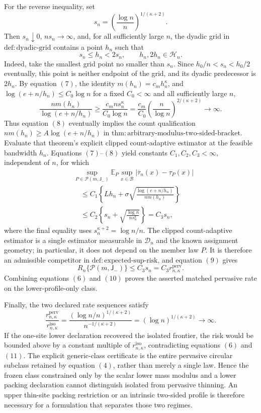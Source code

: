 For the reverse inequality, set
\[
 s_n=\left(\frac{\log n}{n}\right)^{1/(\kappa+2)}.
\]
Then \(s_n\downarrow0\), \(ns_n\to\infty\), and, for all sufficiently large \(n\), the dyadic grid in \(\mathrm{def:dyadic\text{-}grid}\) contains a point \(h_n\) such that
\[
 s_n\le h_n<2s_n,
 \qquad h_n,2h_n\in\mathcal H_n. \tag{7}
\]
Indeed, take the smallest grid point no smaller than \(s_n\).  Since \(h_0/n<s_n<h_0/2\) eventually, this point is neither endpoint of the grid, and its dyadic predecessor is \(2h_n\).  By equation \((7)\), the identity \(m(h_n)=c_mh_n^\kappa\), and \(\log(e+n/h_n)\le C_0\log n\) for a fixed \(C_0<\infty\) and all sufficiently large \(n\),
\[
 \frac{nm(h_n)}{\log(e+n/h_n)}
 \ge \frac{c_mns_n^\kappa}{C_0\log n}
 =\frac{c_m}{C_0}
 \left(\frac n{\log n}\right)^{2/(\kappa+2)}
 \longrightarrow\infty. \tag{8}
\]
Thus equation \((8)\) eventually implies the count qualification \(nm(h_n)\ge A\log(e+n/h_n)\) in \(\mathrm{thm:arbitrary\text{-}modulus\text{-}two\text{-}sided\text{-}bracket}\).  Evaluate that theorem's explicit clipped count-adaptive estimator at the feasible bandwidth \(h_n\).  Equations \((7)\)--\((8)\) yield constants \(C_1,C_2,C_3<\infty\), independent of \(n\), for which
\[
\begin{aligned}
 &\sup_{P\in\mathcal P(m,\mathsf J_-)}
 \mathbb E_P\sup_{x\in\mathcal B}
 |\overline\tau_n(x)-\tau_P(x)| \\
 &\quad\le
 C_1\left\{Lh_n+
 \sigma\sqrt{\frac{\log(e+n/h_n)}{nm(h_n)}}\right\} \\
 &\quad\le C_2\left\{s_n+
 \sqrt{\frac{\log n}{ns_n^\kappa}}\right\}
 =C_3s_n, \tag{9}
\end{aligned}
\]
where the final equality uses \(s_n^{\kappa+2}=\log n/n\).  The clipped count-adaptive estimator is a single estimator measurable in \(\mathcal D_n\) and the known assignment geometry; in particular, it does not depend on the member law \(P\).  It is therefore an admissible competitor in \(\mathrm{def:expected\text{-}sup\text{-}risk}\), and equation \((9)\) gives
\[
 R_n\{\mathcal P(m,\mathsf J_-)\}
 \le C_3s_n
 =C_3r_{n,\kappa}^{\mathrm{perv}}. \tag{10}
\]
Combining equations \((6)\) and \((10)\) proves the asserted matched pervasive rate on the lower-profile-only class.

Finally, the two declared rate sequences satisfy
\[
 \frac{r_{n,\kappa}^{\mathrm{perv}}}
 {r_{n,\kappa}^{\mathrm{iso}}}
 =\frac{(\log n/n)^{1/(\kappa+2)}}
 {n^{-1/(\kappa+2)}}
 =(\log n)^{1/(\kappa+2)}\longrightarrow\infty. \tag{11}
\]
If the one-site lower declaration recovered the isolated frontier, the risk would be bounded above by a constant multiple of \(r_{n,\kappa}^{\mathrm{iso}}\), contradicting equations \((6)\) and \((11)\).  The explicit generic-class certificate is the entire pervasive circular subclass retained by equation \((4)\), rather than merely a single law.  Hence the frozen class constrained only by the scalar lower mass modulus and a lower packing declaration cannot distinguish isolated from pervasive thinning.  An upper thin-site packing restriction or an intrinsic two-sided profile is therefore necessary for a formulation that separates those two regimes.